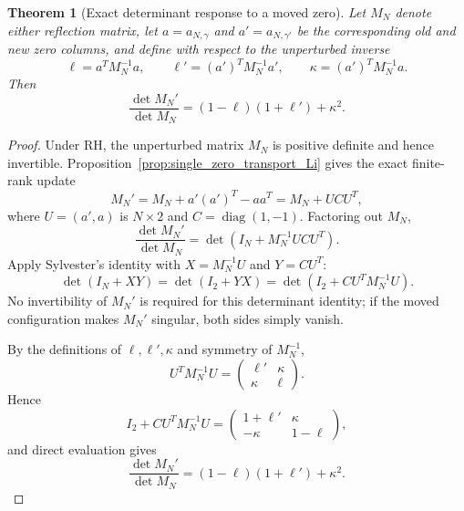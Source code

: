 \documentclass[11pt]{amsart}
\numberwithin{equation}{section}
\theoremstyle{plain}
\newtheorem{theorem}{Theorem}[section]
\theoremstyle{definition}
\theoremstyle{remark}
\newcommand{\RH}{\mathrm{RH}}
\begin{document}
\begin{theorem}[Exact determinant response to a moved zero]
\label{thm:moved_zero_determinant_ratio}
Let $M_N$ denote either reflection matrix, let $a=a_{N,\gamma}$ and $a'=a_{N,\gamma'}$ be the corresponding old and new zero columns, and define with respect to the \emph{unperturbed} inverse
\begin{equation}
\ell=a^TM_N^{-1}a,
\qquad
\ell'=(a')^TM_N^{-1}a',
\qquad
\kappa=(a')^TM_N^{-1}a.
\label{eq:moved_zero_leverages}
\end{equation}
Then
\begin{equation}
\boxed{
\frac{\det M_N'}{\det M_N}
=(1-\ell)(1+\ell')+\kappa^2.}
\label{eq:exact_moved_zero_ratio}
\end{equation}
\end{theorem}

\begin{proof}
Under $\RH$, the unperturbed matrix $M_N$ is positive definite and hence invertible.  Proposition~\ref{prop:single_zero_transport_Li} gives the exact finite-rank update
\begin{equation}
M_N'=M_N+a'(a')^T-aa^T=M_N+UCU^T,
\end{equation}
where $U=(a',a)$ is $N\times2$ and $C=\operatorname{diag}(1,-1)$.  Factoring out $M_N$,
\begin{equation}
\frac{\det M_N'}{\det M_N}
=\det(I_N+M_N^{-1}UCU^T).
\end{equation}
Apply Sylvester's identity with $X=M_N^{-1}U$ and $Y=CU^T$:
\begin{equation}
\det(I_N+XY)=\det(I_2+YX)
=\det(I_2+CU^TM_N^{-1}U).
\end{equation}
No invertibility of $M_N'$ is required for this determinant identity; if the moved configuration makes $M_N'$ singular, both sides simply vanish.

By the definitions of $\ell,\ell',\kappa$ and symmetry of $M_N^{-1}$,
\begin{equation}
U^TM_N^{-1}U
=\begin{pmatrix}\ell'&\kappa\\\kappa&\ell\end{pmatrix}.
\end{equation}
Hence
\begin{equation}
I_2+CU^TM_N^{-1}U
=\begin{pmatrix}1+\ell'&\kappa\\-\kappa&1-\ell\end{pmatrix},
\end{equation}
and direct evaluation gives
\begin{equation}
\frac{\det M_N'}{\det M_N}
=(1-\ell)(1+\ell')+\kappa^2.
\end{equation}
\end{proof}
\end{document}
